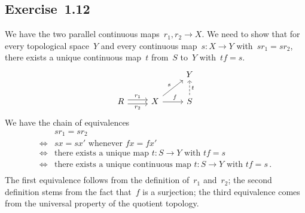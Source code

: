 \subsection{Exercise~1.12}

We have the two parallel continuous maps~$r_1, r_2 \to X$.
We need to show that for every topological space~$Y$ and every continuous map~$s \colon X \to Y$ with~$s r_1 = s r_2$, there exists a unique continuous map~$t$ from~$S$ to~$Y$ with~$t f = s$.
\[
	\begin{tikzcd}
		{}
		&
		{}
		&
		Y
		\\
		R
		\arrow[shift left]{r}[above]{r_1}
		\arrow[shift right]{r}[below]{r_2}
		&
		X
		\arrow{ur}[above left]{s}
		\arrow{r}[above,pos=0.6]{f}
		&
		S
		\arrow[dashed]{u}[right]{t}
	\end{tikzcd}
\]
We have the chain of equivalences
\begin{align*}
	{}&
	s r_1 = s r_2 \\
	\iff{}&
	\text{$s x = s x'$ whenever~$f x = f x'$} \\
	\iff{}&
	\text{there exists a unique map~$\textstyle t \colon S \to Y$ with~$t f = s$} \\
	\iff{}&
	\text{there exists a unique continuous map~$\textstyle t \colon S \to Y$ with~$t f = s$} \,. \\
\end{align*}
The first equivalence follows from the definition of~$r_1$ and~$r_2$;
the second definition stems from the fact that~$f$ is a surjection;
the third equivalence comes from the universal property of the quotient topology.
